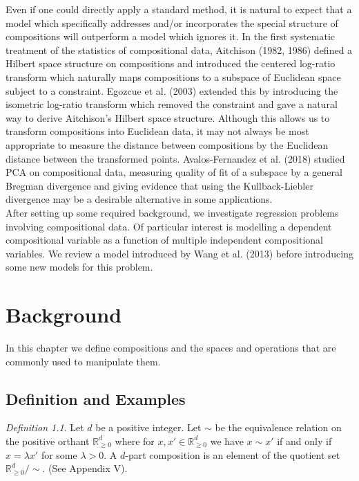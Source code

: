 \documentclass[BSc]{usydthesis}
\numberwithin{equation}{chapter}
\theoremstyle{remark}
\newtheorem{Definition}[equation]{Definition}
\begin{document}
Even if one could directly apply a standard method, it is natural to expect that a model which specifically addresses and/or incorporates the special structure of compositions will outperform a model which ignores it. In the first systematic treatment of the statistics of compositional data, Aitchison (1982, 1986) defined a Hilbert space structure on compositions and introduced the centered log-ratio transform which naturally maps compositions to a subspace of Euclidean space subject to a constraint. Egozcue et al. (2003) extended this by introducing the isometric log-ratio transform which removed the constraint and gave a natural way to derive Aitchison's Hilbert space structure. Although this allows us to transform compositions into Euclidean data, it may not always be most appropriate to measure the distance between compositions by the Euclidean distance between the transformed points. Avalos-Fernandez et al. (2018) studied PCA on compositional data, measuring quality of fit of a subspace by a general Bregman divergence and giving evidence that using the Kullback-Liebler divergence may be a desirable alternative in some applications.\\

After setting up some required background, we investigate regression problems involving compositional data. Of particular interest is modelling a dependent compositional variable as a function of multiple independent compositional variables. We review a model introduced by Wang et al. (2013) before introducing some new models for this problem. 
 
 
 
\chapter{Background}

In this chapter we define compositions and the spaces and operations that are commonly used to manipulate them. 

\section{Definition and Examples}
\begin{Definition}
Let $d$ be a positive integer. Let $\sim$ be the equivalence relation on the positive orthant $\mathbb{R}^d_{\geq 0}$ where for $x, x' \in \mathbb{R}^d_{\geq 0}$ we have $x \sim x'$ if and only if $x = \lambda x'$ for some $\lambda > 0.$ A $d$-part composition is an element of the quotient set $\mathbb{R}^d_{\geq 0}/\sim.$ (See Appendix V).
\end{Definition}
\end{document}
